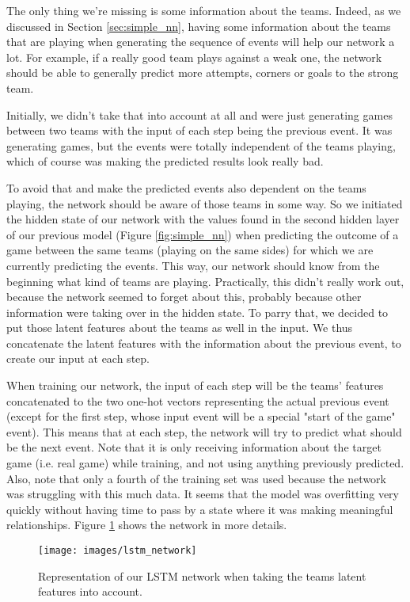 \documentclass[10pt,conference,onecolumn]{IEEEtran}
\begin{document}
The only thing we're missing is some information about the teams. Indeed, as we discussed in Section \ref{sec:simple_nn}, having some information about the teams that are playing when generating the sequence of events will help our network a lot. For example, if a really good team plays against a weak one, the network should be able to generally predict more attempts, corners or goals to the strong team.

Initially, we didn't take that into account at all and were just generating games between two teams with the input of each step being the previous event. It was generating games, but the events were totally independent of the teams playing, which of course was making the predicted results look really bad.

To avoid that and make the predicted events also dependent on the teams playing, the network should be aware of those teams in some way. So we initiated the hidden state of our network with the values found in the second hidden layer of our previous model (Figure \ref{fig:simple_nn}) when predicting the outcome of a game between the same teams (playing on the same sides) for which we are currently predicting the events. This way, our network should know from the beginning what kind of teams are playing. Practically, this didn't really work out, because the network seemed to forget about this, probably because other information were taking over in the hidden state. To parry that, we decided to put those latent features about the teams as well in the input. We thus concatenate the latent features with the information about the previous event, to create our input at each step.

When training our network, the input of each step will be the teams' features concatenated to the two one-hot vectors representing the actual previous event (except for the first step, whose input event will be a special "start of the game" event). This means that at each step, the network will try to predict what should be the next event. Note that it is only receiving information about the target game (i.e. real game) while training, and not using anything previously predicted. Also, note that only a fourth of the training set was used because the network was struggling with this much data. It seems that the model was overfitting very quickly without having time to pass by a state where it was making meaningful relationships. Figure \ref{fig:lstm_network} shows the network in more details.

\begin{figure}[H]
\centering
\texttt{[image: images/lstm\_network]}
\caption{Representation of our LSTM network when taking the teams latent features into account.}
\label{fig:lstm_network}
\end{figure}
\end{document}
